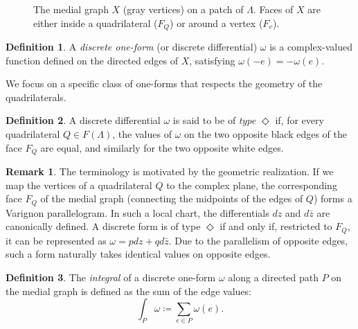 \documentclass[11pt,a4paper]{article}
\theoremstyle{definition}
\newtheorem*{definition}{Definition}
\newtheorem*{remark}{Remark}
\begin{document}
\begin{figure}[htbp]
	\caption{The medial graph $X$ (gray vertices) on a patch of $\Lambda$. Faces of $X$ are either inside a quadrilateral ($F_Q$) or around a vertex ($F_v$).}
	\label{fig:medial_graph}
\end{figure}

\begin{definition}
	A \textit{discrete one-form} (or discrete differential) $\omega$ is a complex-valued function defined on the directed edges of $X$, satisfying $\omega(-e) = -\omega(e)$.
\end{definition}

We focus on a specific class of one-forms that respects the geometry of the quadrilaterals.

\begin{definition}
	A discrete differential $\omega$ is said to be of \textit{type $\Diamond$} if, for every quadrilateral $Q \in F(\Lambda)$, the values of $\omega$ on the two opposite black edges of the face $F_Q$ are equal, and similarly for the two opposite white edges.
\end{definition}

\begin{remark}
	The terminology is motivated by the geometric realization. If we map the vertices of a quadrilateral $Q$ to the complex plane, the corresponding face $F_Q$ of the medial graph (connecting the midpoints of the edges of $Q$) forms a Varignon parallelogram. In such a local chart, the differentials $dz$ and $d\bar{z}$ are canonically defined. A discrete form is of type $\Diamond$ if and only if, restricted to $F_Q$, it can be represented as $\omega = p dz + q d\bar{z}$. Due to the parallelism of opposite edges, such a form naturally takes identical values on opposite edges.
\end{remark}

\begin{definition}
	The \textit{integral} of a discrete one-form $\omega$ along a directed path $P$ on the medial graph is defined as the sum of the edge values:
	\[ \int_P \omega \coloneq \sum_{e \in P} \omega(e). \]
\end{definition}
\end{document}
